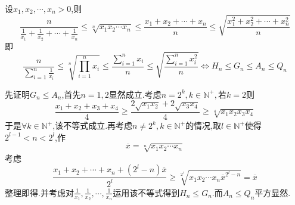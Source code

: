 \begin{formal}
    \begin{theorem}[基本不等式链]\label{thm:基本不等式链}
        设$x_1,x_2,\cdots,x_n>0$,则\[
        \frac{n}{
            \frac{1}{
                x_1
            }+\frac{1}{
                x_2
            }+\cdots+\frac{1}{
                x_n
            }
        }\leqslant\sqrt[n]{
            x_1x_2\cdots x_n
        }\leqslant\frac{
            x_1+x_2+\cdots+x_n
        }{n}\leqslant
        \sqrt{
            \frac{
                x_1^2+x_2^2+\cdots+x_n^2
            }{n}
        }
        \]即\[
        \frac{n}{\sum\limits_{i=1}^{n}\frac{1}{x_i}}\leqslant\sqrt[n]{\prod\limits_{i=1}^{n}x_i}\leqslant\frac{\sum\limits_{i=1}^{n}x_i}{n}\leqslant\sqrt{\frac{\sum\limits_{i=1}^{n}x_i^2}{n}}\Longleftrightarrow
        H_n\leqslant G_n\leqslant A_n\leqslant Q_n
        \]
    \end{theorem}
    \begin{Proof}
        先证明$G_n\leqslant A_n$,首先$n=1,2$显然成立.考虑$n=2^k,k\in \mathbb{N}^+,$若$k=2$则\[
        \frac{x_1+x_2+x_3+x_4}{4}\geqslant\frac{2\sqrt{x_1x_2}+2\sqrt{x_3x_4}}{4}\geqslant\sqrt[4]{x_1x_2x_3x_4}
        \]于是$\forall k\in\mathbb{N}^+$,该不等式成立.再考虑$n\neq 2^k,k\in\mathbb{N}^+$的情况,取$l\in\mathbb{N}^+$使得$2^{l-1}<n<2^l$,作\[
        \overline{x}=\sqrt[n]{x_1x_2\cdots x_n}
        \]考虑\[
        \frac{
            x_1+x_2+\cdots+x_n+\left(2^l-n\right)\overline{x}
        }{2^l}\geqslant \sqrt[2^l]{
            x_1x_2\cdots x_n\overline{x}^{2^l-n}
        }=\overline{x}
        \]整理即得.并考虑对$\displaystyle
        \frac{1}{x_1},\frac{1}{x_2},\cdots,\frac{1}{x_n}$运用该不等式得到$H_n\leqslant G_n$.而$A_n\leqslant Q_n$平方显然.
    \end{Proof}
\end{formal}